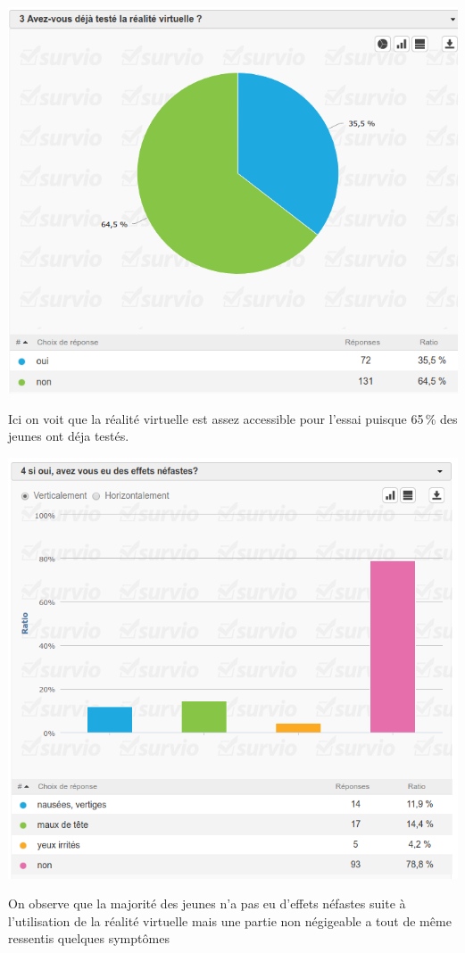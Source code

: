 \documentclass[12pt, a4paper]{report}
\begin{document}
\begin{center}
\includegraphics[scale=0.5]{3.png}

Ici on voit que la réalité virtuelle est assez accessible pour l'essai puisque 65\,\% des jeunes ont déja testés.
\end{center}

\begin{center}
\includegraphics[scale=0.5]{4.png}

 On observe que la majorité des jeunes n'a pas eu d'effets néfastes suite à l'utilisation de la réalité virtuelle mais une partie non négigeable a tout de même ressentis quelques symptômes
\end{center}
\end{document}
